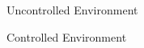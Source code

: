 \documentclass{beamer}
\begin{document}
    \begin{frame}{Uncontrolled Environment}

    \end{frame}

    \begin{frame}{Controlled Environment}

    \end{frame}

    \begin{frame}


    \end{frame}

    
\end{document}
